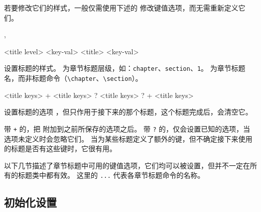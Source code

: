 \documentclass{cusdoc}
\begin{document}

若要修改它们的样式，一般仅需使用下述的  修改键值选项，而无需重新定义它们。

\begin{function}{\setuponetitle,\setuptitle}
  \begin{syntax}
    \V\setuponetitle  <{title level}> <{key-val}>
    \V\setuponetitleq <{title}> <{key-val}>
    \V\setuptitle {}
    \V\setuptitle {} 
  \end{syntax}
设置标题的样式。 为章节标题层级，如：\verb|chapter|、\verb|section|、\verb|1|。 为章节标题名，而非标题命令（\verb|\chapter|、\verb|\section|）。
\end{function}

\begin{function}{\setupnexttitle}
  \begin{syntax}
    \V\setupnexttitle     <{title keys}>
    \V\setupnexttitle   + <{title keys}>
    \V\setupnexttitle ?   <{title keys}>
    \V\setupnexttitle ? + <{title keys}>
  \end{syntax}
设置标题的选项 ，但只作用于接下来的那个标题，这个标题完成后，会清空它。

带 \texttt{+} 的，把  附加到之前所保存的选项之后。
带 \texttt{?} 的，仅会设置已知的选项，当选项未定义时会忽略它们。
当为某些标题定义了额外的键，但不确定接下来使用的标题是否有这些键时，它很有用。
\end{function}

以下几节描述了章节标题中可用的键值选项，它们均可以被设置，但并不一定在所有的标题类中都有效。
这里的 \texttt{...} 代表各章节标题命令的名称。


\subsection{初始化设置}
\end{document}
